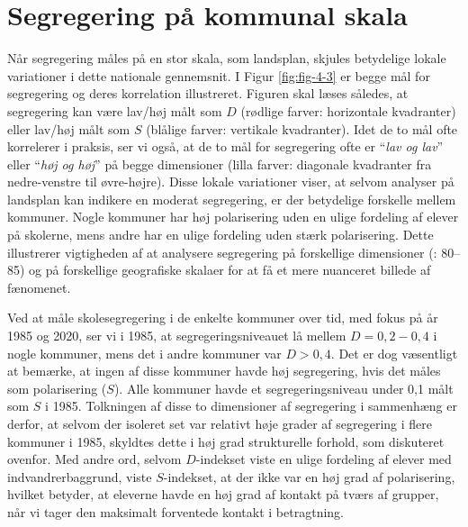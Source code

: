 \documentclass[
]{book}
\begin{document}
\section{Segregering på kommunal skala}\label{segregering-puxe5-kommunal-skala}

Når segregering måles på en stor skala, som landsplan, skjules betydelige lokale variationer i dette nationale gennemsnit. I Figur \ref{fig:fig-4-3} er begge mål for segregering og deres korrelation illustreret. Figuren skal læses således, at segregering kan være lav/høj målt som \(D\) (rødlige farver: horizontale kvadranter) eller lav/høj målt som \(S\) (blålige farver: vertikale kvadranter). Idet de to mål ofte korrelerer i praksis, ser vi også, at de to mål for segregering ofte er ``\emph{lav og lav}'' eller ``\emph{høj og høj}'' på begge dimensioner (lilla farver: diagonale kvadranter fra nedre-venstre til øvre-højre). Disse lokale variationer viser, at selvom analyser på landsplan kan indikere en moderat segregering, er der betydelige forskelle mellem kommuner. Nogle kommuner har høj polarisering uden en ulige fordeling af elever på skolerne, mens andre har en ulige fordeling uden stærk polarisering. Dette illustrerer vigtigheden af at analysere segregering på forskellige dimensioner (: 80--85) og på forskellige geografiske skalaer for at få et mere nuanceret billede af fænomenet.

Ved at måle skolesegregering i de enkelte kommuner over tid, med fokus på år 1985 og 2020, ser vi i 1985, at segregeringsniveauet lå mellem \(D=0,2-0,4\) i nogle kommuner, mens det i andre kommuner var \(D>0,4\). Det er dog væsentligt at bemærke, at ingen af disse kommuner havde høj segregering, hvis det måles som polarisering (\(S\)). Alle kommuner havde et segregeringsniveau under 0,1 målt som \(S\) i 1985. Tolkningen af disse to dimensioner af segregering i sammenhæng er derfor, at selvom der isoleret set var relativt høje grader af segregering i flere kommuner i 1985, skyldtes dette i høj grad strukturelle forhold, som diskuteret ovenfor. Med andre ord, selvom \(D\)-indekset viste en ulige fordeling af elever med indvandrerbaggrund, viste \(S\)-indekset, at der ikke var en høj grad af polarisering, hvilket betyder, at eleverne havde en høj grad af kontakt på tværs af grupper, når vi tager den maksimalt forventede kontakt i betragtning.
\end{document}
